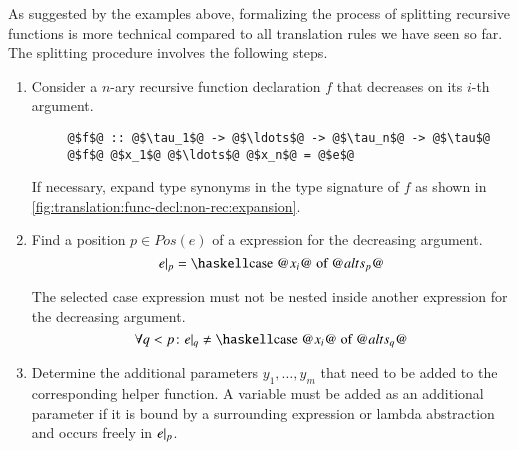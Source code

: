 As suggested by the examples above, formalizing the process of splitting recursive functions is more technical compared to all translation rules we have seen so far.
The splitting procedure involves the following steps.

\begin{enumerate}
  \item
  Consider a $n$-ary recursive function declaration $f$ that decreases on its $i$-th argument.
  \begin{verbatim}
     @$f$@ :: @$\tau_1$@ -> @$\ldots$@ -> @$\tau_n$@ -> @$\tau$@
     @$f$@ @$x_1$@ @$\ldots$@ @$x_n$@ = @$e$@
  \end{verbatim}
  If necessary, expand type synonyms in the type signature of $f$ as shown in \autoref{fig:translation:func-decl:non-rec:expansion}.

  \item
  Find a position $p \in Pos(e)$ of a  expression for the decreasing argument.
  \[
    \subterm{e}{p} = \haskellM{case @$x_i$@ of @$alts_p$@}
  \]

  The selected case expression must not be nested inside another  expression for the decreasing argument.
  \[
    \forall q < p \colon \subterm{e}{q} \ne \haskellM{case @$x_i$@ of @$alts_q$@}
  \]

  \item
  Determine the additional parameters $y_1, \ldots, y_m$ that need to be added to the corresponding helper function.
  A variable must be added as an additional parameter if it is bound by a surrounding  expression or lambda abstraction and occurs freely in ${e}|_{p}$.


\end{enumerate}
